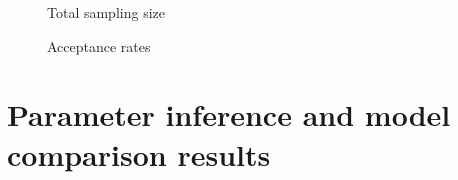 \documentclass[12pt,a4paper]{report}
\begin{document}
\begin{figure}[h!]

    \begin{center}
    \end{center}
    
    \caption{Total sampling size} 
    \label{fig:kernel2}

    \begin{center}
        \end{center}
        
        \caption{Acceptance rates} 
        \label{fig:acceptance2}
    
\end{figure}


\section{Parameter inference and model comparison results}
\end{document}

